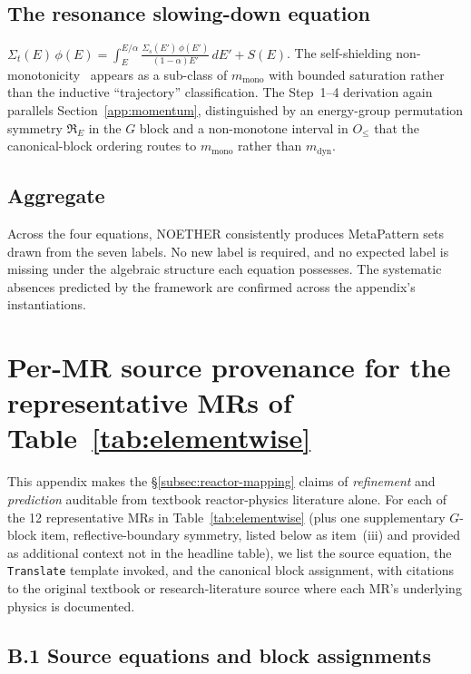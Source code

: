 \subsection{The resonance slowing-down equation}

$\Sigma_t(E)\,\phi(E) = \int_{E}^{E/\alpha} \frac{\Sigma_s(E')\,\phi(E')}{(1-\alpha)E'}\,dE' + S(E)$. The self-shielding non-monotonicity~\cite{BellGlasstone1970, LewisMiller1993} appears as a sub-class of $m_{\mathrm{mono}}$ with bounded saturation rather than the inductive ``trajectory'' classification. The Step~1--4 derivation again parallels Section~\ref{app:momentum}, distinguished by an energy-group permutation symmetry $\mathfrak{R}_E$ in the $G$ block and a non-monotone interval in $O_{\le}$ that the canonical-block ordering routes to $m_{\mathrm{mono}}$ rather than $m_{\mathrm{dyn}}$.

\subsection{Aggregate}

Across the four equations, NOETHER consistently produces MetaPattern sets drawn from the seven labels. No new label is required, and no expected label is missing under the algebraic structure each equation possesses. The systematic absences predicted by the framework are confirmed across the appendix's instantiations.

\section{Per-MR source provenance for the representative MRs of Table~\ref{tab:elementwise}}
\label{app:per-mr}

This appendix makes the §\ref{subsec:reactor-mapping} claims of \emph{refinement} and \emph{prediction} auditable from textbook reactor-physics literature alone. For each of the 12 representative MRs in Table~\ref{tab:elementwise} (plus one supplementary $G$-block item, reflective-boundary symmetry, listed below as item~(iii) and provided as additional context not in the headline table), we list the source equation, the \texttt{Translate} template invoked, and the canonical block assignment, with citations to the original textbook or research-literature source where each MR's underlying physics is documented.

\subsection*{B.1 Source equations and block assignments}

